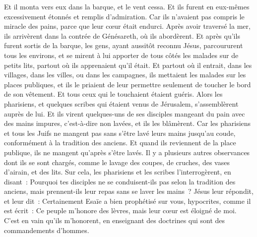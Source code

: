 \begin{multicols}{2}
Et il monta vers eux dans la barque, et le vent cessa. Et ils furent en eux-mêmes excessivement étonnés et remplis d'admiration.
Car ils n'avaient pas compris le miracle des pains, parce que leur cœur était endurci.
Après avoir traversé la mer, ils arrivèrent dans la contrée de Génésareth, où ils abordèrent.
Et après qu'ils furent sortis de la barque, les gens, ayant aussitôt reconnu Jésus,
parcoururent tous les environs, et se mirent à lui apporter de tous côtés les malades sur de petits lits, partout où ils apprenaient qu'il était.
Et partout où il entrait, dans les villages, dans les villes, ou dans les campagnes, ils mettaient les malades sur les places publiques, et ils le priaient de leur permettre seulement de toucher le bord de son vêtement. Et tous ceux qui le touchaient étaient guéris.
\VerseOne{}Alors les pharisiens, et quelques scribes qui étaient venus de Jérusalem, s'assemblèrent auprès de lui.
Et ils virent quelques-uns de ses disciples mangeant du pain avec des mains impures, c'est-à-dire non lavées, et ils les blâmèrent.
Car les pharisiens et tous les Juifs ne mangent pas sans s'être lavé leurs mains jusqu'au coude, conformément à la tradition des anciens.
Et quand ils reviennent de la place publique, ils ne mangent qu'après s'être lavés. Il y a plusieurs autres observances dont ils se sont chargés, comme le lavage des coupes, de cruches, des vases d'airain, et des lits.
Sur cela, les pharisiens et les scribes l'interrogèrent, en disant~: Pourquoi tes disciples ne se conduisent-ils pas selon la tradition des anciens, mais prennent-ils leur repas sans se laver les mains~?
Jésus leur répondit, et leur dit~: Certainement Esaïe a bien prophétisé sur vous, hypocrites, comme il est écrit~: Ce peuple m'honore des lèvres, mais leur cœur est éloigné de moi.
C'est en vain qu'ils m'honorent, en enseignant des doctrines qui sont des commandements d'hommes.

\end{multicols}
